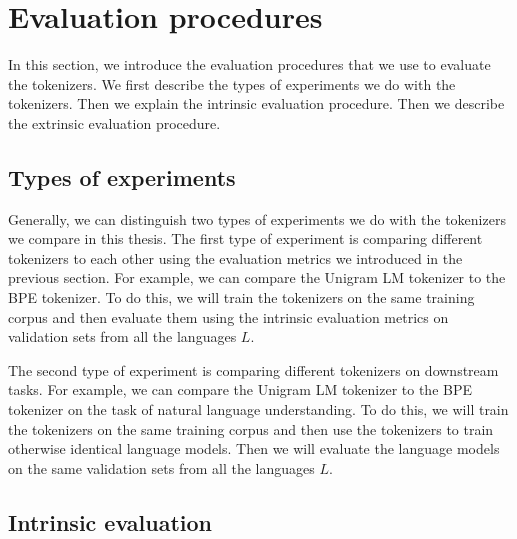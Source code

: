 


\section{Evaluation procedures}

In this section, we introduce the evaluation procedures that we use to evaluate the tokenizers. We first describe the types of experiments we do with the tokenizers. Then we explain the intrinsic evaluation procedure. Then we describe the extrinsic evaluation procedure.

\subsection{Types of experiments}

Generally, we can distinguish two types of experiments we do with the tokenizers we compare in this thesis. The first type of experiment is comparing different tokenizers to each other using the evaluation metrics we introduced in the previous section. For example, we can compare the Unigram LM tokenizer to the BPE tokenizer. To do this, we will train the tokenizers on the same training corpus and then evaluate them using the intrinsic evaluation metrics on validation sets from all the languages $L$. 

The second type of experiment is comparing different tokenizers on downstream tasks. For example, we can compare the Unigram LM tokenizer to the BPE tokenizer on the task of natural language understanding. To do this, we will train the tokenizers on the same training corpus and then use the tokenizers to train otherwise identical language models. Then we will evaluate the language models on the same validation sets from all the languages $L$. 

\subsection{Intrinsic evaluation}
\label{sec:intrinsic_evaluation}

